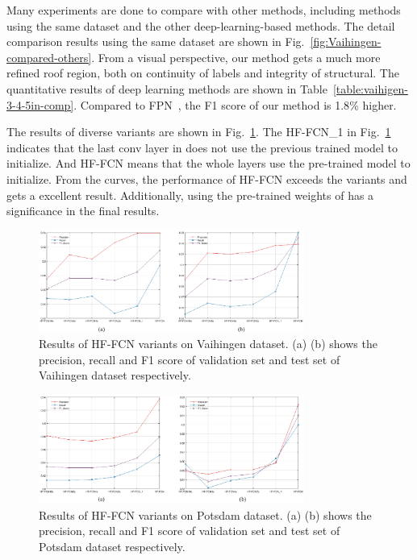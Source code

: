 Many experiments are done to compare with other methods, including methods using the same dataset and the other deep-learning-based methods.
The detail comparison results using the same dataset are shown in Fig.~\ref{fig:Vaihingen-compared-others}.
From a visual perspective, our method gets a much more refined roof region, both on continuity of labels and integrity of structural.
The quantitative results of deep learning methods are shown in Table~\ref{table:vaihigen-3-4-5in-comp}.
Compared to FPN~\cite{IEEEexample:lin2017feature}, the F1 score of our method is 1.8{\%} higher.

The results of diverse variants are shown in Fig.~\ref{fig:Vaihingen-variants}. The HF-FCN\_1 in Fig.~\ref{fig:Vaihingen-variants} indicates that the last conv layer in  does not use the previous trained model to initialize. And HF-FCN means that the whole layers use the pre-trained model to initialize. From the curves, the performance of HF-FCN exceeds the variants and gets a excellent result. Additionally, using the pre-trained weights of  has a significance in the final results.

\begin{figure}
\vspace{-0.2cm}
\setlength{\abovecaptionskip}{-0cm}
\setlength{\belowcaptionskip}{-1cm}
\centering
\includegraphics[width=8.7cm]{Figures/vaihingen_variants.eps}
\caption{Results of HF-FCN variants on Vaihingen dataset. (a) (b) shows the precision, recall and F1 score of validation set and test set of Vaihingen dataset respectively.}
\label{fig:Vaihingen-variants}
\end{figure}

\begin{figure}
\vspace{-0.4cm}
\setlength{\abovecaptionskip}{-0cm}
\setlength{\belowcaptionskip}{-2cm}
\centering
\includegraphics[width=8.7cm]{Figures/Potsdam_variants.eps}
\caption{Results of HF-FCN variants on Potsdam dataset. (a) (b) shows the precision, recall and F1 score of validation set and test set of Potsdam dataset respectively.}
\label{fig:Potsdam-variants}
\end{figure}

